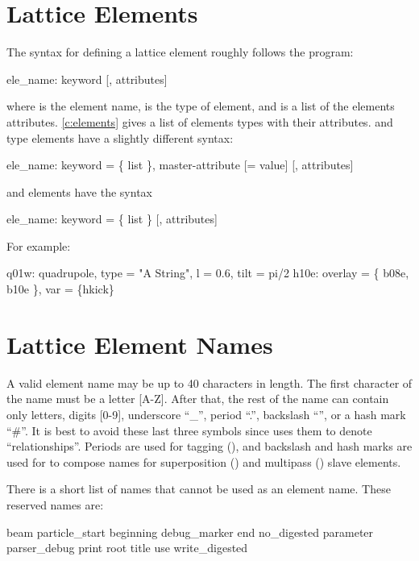 \section{Lattice Elements}

The syntax for defining a lattice element roughly follows the
\mad\cite{b:maduser} program:
\begin{example}
  ele_name: keyword [, attributes]
\end{example}
where  is the element name,  is the type of
element, and  is a list of the elements
attributes. \cref{c:elements} gives a list of elements types with
their attributes.
 and  type elements have a slightly different syntax:
\begin{example}
  ele_name: keyword = \{ list \}, master-attribute [= value] [, attributes]
\end{example}
and  elements have the syntax
\begin{example}
  ele_name: keyword = \{ list \} [, attributes]
\end{example}  
For example:
\begin{example}
  q01w: quadrupole, type = "A String", l = 0.6, tilt = pi/2
  h10e: overlay = \{ b08e, b10e \}, var = \{hkick\}
\end{example}

\section{Lattice Element Names}
\label{s:ele.names}

A valid element name may be up to 40 characters in length. The first character of the name must be a
letter [A-Z]. After that, the rest of the name can contain only letters, digits [0-9], underscore
``_'', period ``.'', backslash ``\B'', or a hash mark ``\#''. It is best to avoid these last three
symbols since \bmad uses them to denote ``relationships''.  Periods are used for tagging
(), and backslash and hash marks are used for to compose names for superposition
() and multipass () slave elements.

There is a short list of names that cannot be used as an element name. These reserved names are:
\begin{example}
  beam
  particle_start
  beginning
  debug_marker
  end
  no_digested
  parameter
  parser_debug
  print
  root
  title
  use
  write_digested
\end{example}

